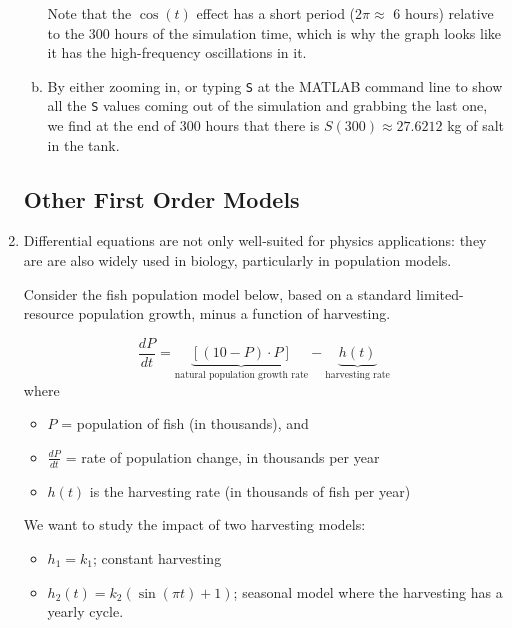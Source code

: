 \begin{enumerate}[1.]
\begin{Solution}
\begin{enumerate}[(a)]
  Note that the $\cos(t)$ effect has a short period ($2 \pi \approx $ 6 hours)
  relative to the 300 hours of the simulation time, which is why the
  graph looks like it has the high-frequency oscillations in it.

\item By either zooming in, or typing \verb#S# at the MATLAB command
  line to show all the \verb#S# values coming out of the simulation
  and grabbing the last one, we find at the end of 300 hours that
  there is $S(300) \approx 27.6212$ kg of salt in the tank.

  \end{enumerate}
  
\end{Solution}

\subsection*{Other First Order Models}
\item 
  \begin{Question}
    
Differential equations are not only well-suited for physics
  applications: they are are also widely used in biology, particularly
  in population models.

  Consider the fish population model below, based on a standard
  limited-resource population growth, minus a function of harvesting.

$$\frac{dP}{dt} =\underbrace{ [(10 -P)\cdot P]}_{\mbox{natural population growth rate}} -\underbrace{h(t)}_{\mbox{harvesting rate}}$$
where
\begin{itemize}
\item $P$  = population of fish (in thousands), and 
\item $\frac{dP}{dt}$  = rate of population change, in thousands per 
year
\item $h(t)$ is the harvesting rate (in thousands of fish per 
year)
\end{itemize}

We want to study the impact of two harvesting models:
\begin{itemize}
\item $h_1 = k_1$; constant harvesting
\item $h_2(t) = k_2 (\sin(\pi t) + 1)$; seasonal model where the
  harvesting has a yearly cycle.
\end{itemize}
\begin{enumerate}[(a)]


\end{enumerate}
\end{Question}
\end{enumerate}
